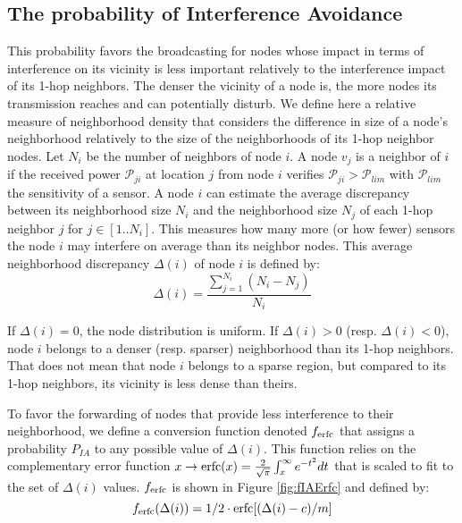 \documentclass[journal, peerreview, onecolumn, draftcls]{IEEEtran}
\begin{document}
\subsection{The probability of Interference Avoidance}

This probability favors the broadcasting for nodes whose impact in terms of interference on its vicinity is less important relatively to the interference impact of its 1-hop neighbors.
The denser the vicinity of a node is, the more nodes its transmission reaches and can potentially disturb. We define here a relative measure of neighborhood density that considers the difference in size of a node's neighborhood relatively to the size of the neighborhoods of its 1-hop neighbor nodes.
Let $N_i$ be the number of neighbors of node $i$. A node $v_j$ is a neighbor of $i$ if the received power $\mathcal{P}_{ji}$ at location $j$ from node $i$ verifies $\mathcal{P}_{ji} > \mathcal{P}_{lim}$ with $\mathcal{P}_{lim}$ the sensitivity of a sensor.
A node $i$ can estimate the average discrepancy between its neighborhood size $N_i$ and the neighborhood size $N_j$ of each 1-hop neighbor $j$ for $j\in [1..N_i]$. This measures how many more (or how fewer) sensors the node $i$ may interfere on average than its neighbor nodes.
This average neighborhood discrepancy $\Delta(i)$ of node $i$ is defined by:
\begin{equation}\label{eq:delta}
\Delta(i) = \frac{\sum_{j=1}^{N_i} (N_i-N_j)}{N_i}
\end{equation}

If $\Delta(i)=0$, the node distribution is uniform. If $\Delta(i) > 0$ (resp. $\Delta(i) < 0$), node $i$ belongs to a denser (resp. sparser) neighborhood than its 1-hop neighbors. That does not mean that node $i$ belongs to a sparse region, but compared to its 1-hop neighbors, its vicinity is less dense than theirs.

To favor the forwarding of nodes that provide less interference to their neighborhood, we define a conversion function denoted $f_{\rm erfc}$ that assigns a probability $P_{IA}$ to any possible value of $\Delta(i)$. This function relies on the complementary error function $x \rightarrow {\rm erfc}(x)=\frac{2}{\sqrt{\pi}} \int_x^\infty e^{-t^2}dt$ that is scaled to fit to the set of $\Delta(i)$ values. $f_{\rm erfc}$ is shown in Figure \ref{fig:fIAErfc} and defined by:
\begin{equation}\label{eq:fIAErfc}
    f_{ \rm erfc}(\Delta(i)) = 1/2 \cdot {\rm erfc}[(\Delta(i)-c)/m]
\end{equation}
\end{document}
